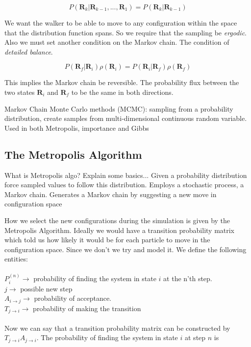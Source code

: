 \begin{equation}
P(\mathbf{R}_k|\mathbf{R}_{k-1}, ...,\mathbf{R}_1) = P(\mathbf{R}_k|\mathbf{R}_{k-1})
\end{equation}

We want the walker to be able to move to any configuration within the space that the distribution function spans. So we require that the sampling be \textit{ergodic}. Also we must set another condition on the Markov chain. The condition of \textit{detailed balance}. 

\begin{equation}
P(\mathbf{R}_f|\mathbf{R}_i) \rho(\mathbf{R}_i) = P(\mathbf{R}_i|\mathbf{R}_f) \rho(\mathbf{R}_f)
\end{equation}

This implies the Markov chain be reversible. The probability flux between the two states $\mathbf{R}_i$ and $\mathbf{R}_f$ to be the same in both directions. \cite{toulouse2016introduction}

Markov Chain Monte Carlo methods (MCMC): sampling from a probability distribution, create samples from multi-dimensional continuous random variable. Used in both Metropolis, importance and Gibbs

\subsection{The Metropolis Algorithm}

What is Metropolis algo? Explain some basics...
Given a probability distribution force sampled values to follow this distribution. Employs a stochastic process, a Markov chain.
Generates a Markov chain by suggesting a new move in configuration space

How we select the new configurations during the simulation is given by the Metropolis Algorithm. 
Ideally we would have a transition probability matrix which told us how likely it would be for each particle to move in the configuration space. Since we don't we try and model it.
We define the following entities:
\\
\\
$P_i^{(n)} \rightarrow$ probability of finding the system in state $i$ at the n'th step.
\\
$j \rightarrow$ possible new step
\\
$A_{i \rightarrow j} \rightarrow$ probability of acceptance. 
\\
$T_{j \rightarrow i} \rightarrow$ probability of making the transition  
\\
\\
Now we can say that a transition probability matrix can be constructed by $T_{j \rightarrow i}A_{j \rightarrow i}.$ The probability of finding the system in state $i$ at step $n$ is

